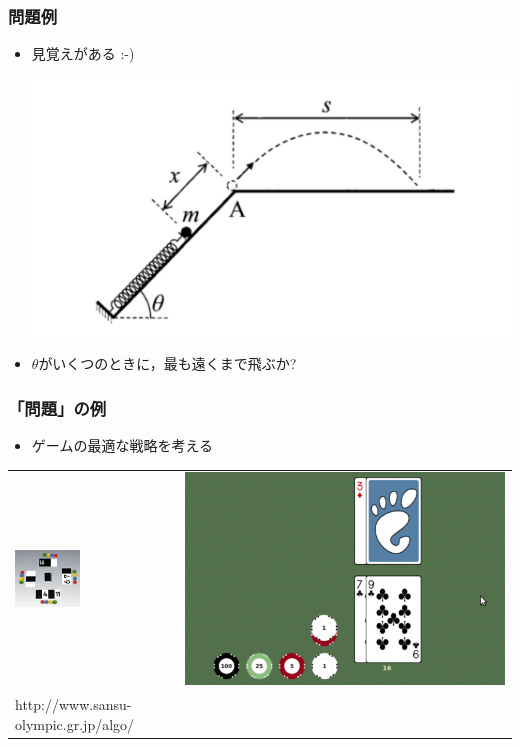 \documentclass[12pt,dvipdfmx]{beamer}
\begin{document}
\begin{frame}
\frametitle{問題例}
\begin{itemize}
\item 見覚えがある :-)

\includegraphics[width=\textwidth]{out/pdf/img/physics.pdf}

\item $\theta$がいくつのときに，最も遠くまで飛ぶか?
\end{itemize}
\end{frame}

\begin{frame}
\frametitle{「問題」の例}
\begin{itemize}
\item ゲームの最適な戦略を考える
\end{itemize}

\begin{center}
\begin{tabular}{ll}
\includegraphics[height=0.3\textwidth]{out/pdf/img/algo-cards.pdf}
&    
\includegraphics[height=0.3\textwidth]{out/pdf/img/blackjack.pdf}
\\
{\scriptsize http://www.sansu-olympic.gr.jp/algo/}
\end{tabular}
\end{center}
\end{frame}
\end{document}
